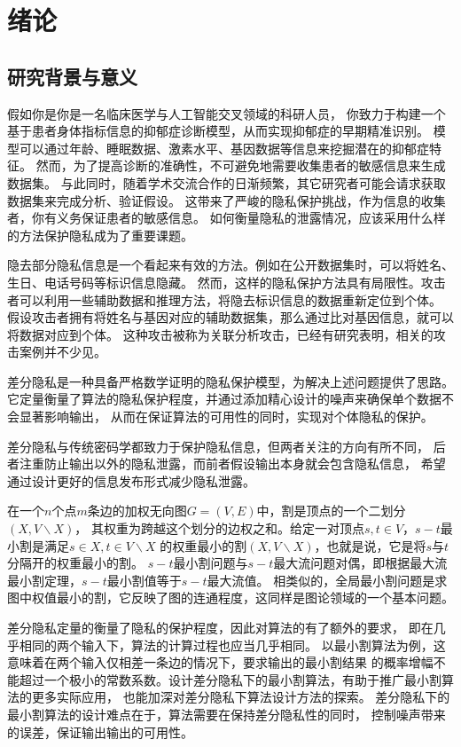 \chapter{绪论}
\label{chap:introduction}
\section{研究背景与意义}

假如你是你是一名临床医学与人工智能交叉领域的科研人员，
你致力于构建一个基于患者身体指标信息的抑郁症诊断模型，从而实现抑郁症的早期精准识别。
模型可以通过年龄、睡眠数据、激素水平、基因数据等信息来挖掘潜在的抑郁症特征。
然而，为了提高诊断的准确性，不可避免地需要收集患者的敏感信息来生成数据集。
与此同时，随着学术交流合作的日渐频繁，其它研究者可能会请求获取数据集来完成分析、验证假设。
这带来了严峻的隐私保护挑战，作为信息的收集者，你有义务保证患者的敏感信息。
如何衡量隐私的泄露情况，应该采用什么样的方法保护隐私成为了重要课题。

隐去部分隐私信息是一个看起来有效的方法。例如在公开数据集时，可以将姓名、生日、电话号码等标识信息隐藏。
然而，这样的隐私保护方法具有局限性。攻击者可以利用一些辅助数据和推理方法，将隐去标识信息的数据重新定位到个体。
假设攻击者拥有将姓名与基因对应的辅助数据集，那么通过比对基因信息，就可以将数据对应到个体。
这种攻击被称为关联分析攻击，已经有研究表明，相关的攻击案例并不少见。\cite{narayanan2016precautionary}

差分隐私是一种具备严格数学证明的隐私保护模型，为解决上述问题提供了思路。
它定量衡量了算法的隐私保护程度，并通过添加精心设计的噪声来确保单个数据不会显著影响输出，
从而在保证算法的可用性的同时，实现对个体隐私的保护。

差分隐私与传统密码学都致力于保护隐私信息，但两者关注的方向有所不同，
后者注重防止输出以外的隐私泄露，而前者假设输出本身就会包含隐私信息，
希望通过设计更好的信息发布形式减少隐私泄露。

在一个$n$个点$m$条边的加权无向图$G=(V,E)$中，割是顶点的一个二划分$(X,V\backslash X)$，
其权重为跨越这个划分的边权之和。给定一对顶点$s,t\in V$，$s-t$最小割是满足$s\in X,t\in V\backslash X$
的权重最小的割$(X,V\backslash X)$，也就是说，它是将$s$与$t$分隔开的权重最小的割。
$s-t$最小割问题与$s-t$最大流问题对偶，即根据最大流最小割定理，$s-t$最小割值等于$s-t$最大流值。\cite{ford1956maximal}
相类似的，全局最小割问题是求图中权值最小的割，它反映了图的连通程度，这同样是图论领域的一个基本问题。

差分隐私定量的衡量了隐私的保护程度，因此对算法的有了额外的要求，
即在几乎相同的两个输入下，算法的计算过程也应当几乎相同。
以最小割算法为例，这意味着在两个输入仅相差一条边的情况下，要求输出的最小割结果
的概率增幅不能超过一个极小的常数系数。设计差分隐私下的最小割算法，有助于推广最小割算法的更多实际应用，
也能加深对差分隐私下算法设计方法的探索。
差分隐私下的最小割算法的设计难点在于，算法需要在保持差分隐私性的同时，
控制噪声带来的误差，保证输出输出的可用性。


